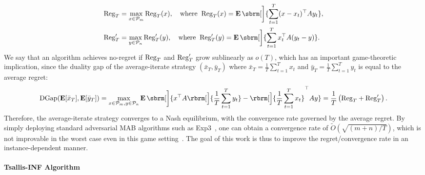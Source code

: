 \begin{equation}
\begin{aligned}
    \Rr_T &= \max_{x \in \cP_m} \Rr_T(x),
    \quad\text{where}\;\;
    \Rr_T(x)
    =
    \E \sbrm[\bigg]{
    \sum_{t=1}^T
    (x - x_t)^\top
    A
    y_t
    },
    \\
    \Rc_T &= \max_{y \in \cP_n} \Rc_T(y),
    \quad\text{where}\;\;
    \Rc_T(y)
    =
    \E \sbrm[\bigg]{
    \sum_{t=1}^T
    x_t^\top
    A
    (y_t - y)
    }.  
\end{aligned}
    \label{eq:defR}
\end{equation}
We say that an algorithm achieves no-regret if $\mathrm{Reg}_T$ and $\mathrm{Reg}'_T$ grow sublinearly as $o(T)$, which has
an important game-theoretic implication, since the duality gap of the average-iterate strategy $(\bar{x}_T, \bar{y}_T)$ where
$\bar{x}_T= \frac{1}{T}{\sum_{t=1}^T x_t}$ and
$\bar{y}_T= \frac{1}{T}{\sum_{t=1}^T y_t}$ is equal to the average regret:
\begin{align*}
    \DG(\E[\bar{x}_T], \E[\bar{y}_T])
    =
    \max_{x \in \cP_m, y \in \cP_n}
    \E \sbrm[\bigg]{
        x^\top A \rbrm[\Big]{ \frac{1}{T} \sum_{t=1}^T y_t }
        -
        \rbrm[\Big]{ \frac{1}{T} \sum_{t=1}^T x_t }^\top
        A 
        y
    }
    =
    \frac{1}{T}
    \left(
    \Rr_T
    +
    \Rc_T
    \right).
\end{align*}
 Therefore, the average-iterate strategy converges to a Nash equilibrium, with the convergence rate governed by the average regret.
By simply deploying standard adversarial MAB algorithms such as Exp3~\citep{auer2002nonstochastic},
one can obtain a convergence rate of $\tilde{O}(\sqrt{(m+n)/T})$, which is not improvable in the worst case even in this game setting~\citep{klein1999number}.
The goal of this work is thus to improve the regret/convergence rate in an instance-dependent manner.

\paragraph{Tsallis-INF Algorithm}

